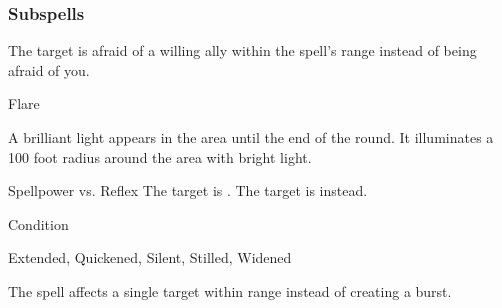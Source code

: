 \subsubsection{Subspells}
The target is afraid of a willing ally within the spell's range instead of being afraid of you.
\begin{spellsection}{Flare}
\begin{spellcontent}
\begin{spelltargetinginfo}
\end{spelltargetinginfo}
\begin{spelleffects}
\spelleffect
A brilliant light appears in the area until the end of the round.
It illuminates a 100 foot radius around the area with bright light.
\begin{spellattack}{Spellpower vs. Reflex}
\spellsuccess
The target is \dazzled.
\spellcritical
The target is \blinded instead.
\end{spellattack}
\spelldur Condition
\end{spelleffects}
\end{spellcontent}
\begin{spellfooter}
 Extended, Quickened, Silent, Stilled, Widened
\end{spellfooter}
\begin{spellsubcontent}
\begin{spellcantrip}
The spell affects a single target within range instead of creating a burst.
\end{spellcantrip}
\end{spellsubcontent}
\end{spellsection}
